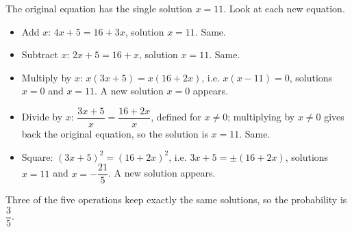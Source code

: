 The original equation has the single solution $x=11$. Look at each new equation.
\begin{itemize}
\item Add $x$: $4x+5=16+3x$, solution $x=11$. Same.
\item Subtract $x$: $2x+5=16+x$, solution $x=11$. Same.
\item Multiply by $x$: $x(3x+5)=x(16+2x)$, i.e. $x(x-11)=0$, solutions $x=0$ and $x=11$. A new solution $x=0$ appears.
\item Divide by $x$: $\dfrac{3x+5}{x}=\dfrac{16+2x}{x}$, defined for $x\ne0$; multiplying by $x\ne0$ gives back the original equation, so the solution is $x=11$. Same.
\item Square: $(3x+5)^2=(16+2x)^2$, i.e. $3x+5=\pm(16+2x)$, solutions $x=11$ and $x=-\dfrac{21}{5}$. A new solution appears.
\end{itemize}
Three of the five operations keep exactly the same solutions, so the probability is $\boxed{\dfrac35}$.
